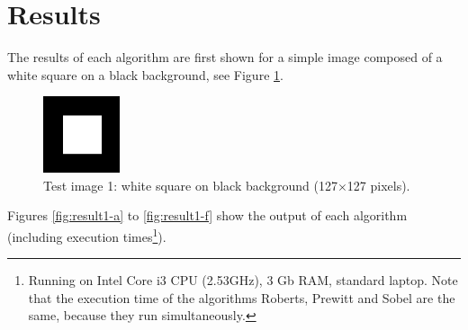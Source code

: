 \documentclass{ipol}
\numberwithin{equation}{section}
\numberwithin{table}{section}
\begin{document}
{%



\section{Results}
\label{sec:results}

The results of each algorithm are first shown for a simple image composed of a white square on a black background, see Figure \ref{fig:original1}. 

\begin{figure}[h!]
	\centering
	\includegraphics[width=0.2\textwidth]{results/square127.png}
	\caption{Test image 1: white square on black background (127$\times$127 pixels).}
	\label{fig:original1}
\end{figure}

Figures \ref{fig:result1-a} to \ref{fig:result1-f} show the output of each algorithm (including execution times\footnote{Running on Intel Core i3 CPU (2.53GHz), 3 Gb RAM, standard laptop. Note that the execution time of the algorithms Roberts, Prewitt and Sobel are the same, because they run simultaneously.}). 

\begin{figure}[h!]
	\centering
	\quad
	\quad


\end{figure}}
\end{document}
